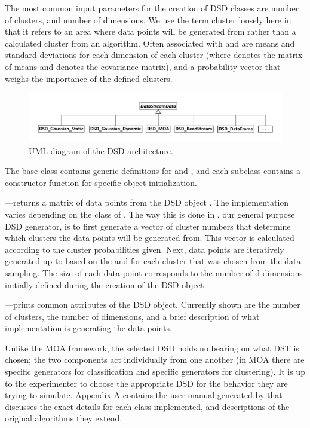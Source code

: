 \documentclass[nojss]{jss}
\begin{document}
The most common input parameters for the creation of DSD classes are  number of clusters, and  number of dimensions. We use the term cluster loosely here in that it refers to an area where data points will be generated from rather than a calculated cluster from an algorithm. Often associated with  and  are means and standard deviations for each dimension of each cluster (where  denotes the matrix of means and  denotes the covariance matrix), and a probability vector that weighs the importance of the defined clusters.

\begin{figure}
\centering
\includegraphics{dsd_uml}
\caption{UML diagram of the DSD architecture.}
\label{figure:dsd}
\end{figure}

The base class contains generic definitions for  and , and each subclass contains a constructor function for specific object initialization. 


%
---returns a matrix of data points from the DSD object . The implementation varies depending on the class of . The way this is done in , our general purpose DSD generator, is to first generate a vector of cluster numbers that determine which clusters the data points will be generated from. This vector is calculated according to the cluster probabilities given. Next, data points are iteratively generated up to  based on the  and  for each cluster that was chosen from the data sampling. The size of each data point corresponds to the number of d dimensions initially defined during the creation of the DSD object.


%
---prints common attributes of the DSD object. Currently shown are the number of clusters, the number of dimensions, and a brief description of what implementation is generating the data points.


Unlike the MOA framework, the selected DSD holds no bearing on what DST is chosen; the two components act individually from one another (in MOA there are specific generators for classification and specific generators for clustering). It is up to the experimenter to choose the appropriate DSD for the behavior they are trying to simulate. Appendix A contains the user manual generated by  that discusses the exact details for each class implemented, and descriptions of the original algorithms they extend.
\end{document}
